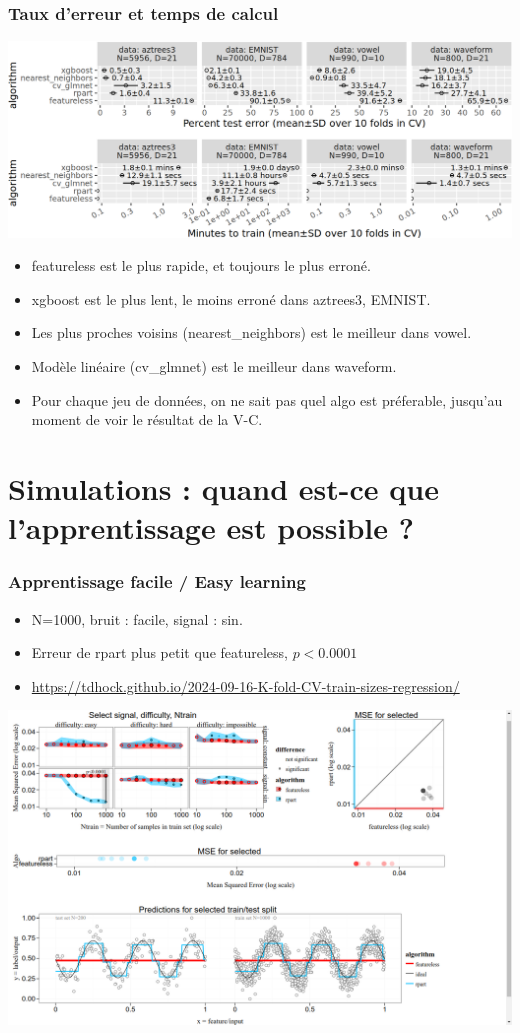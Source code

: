 \documentclass{beamer}
\begin{document}
\begin{frame}
  \frametitle{Taux d'erreur et temps de calcul}
  \includegraphics[width=\textwidth]{../cv-evaluation-examples/zz_error_minutes_4_data.png}
  \begin{itemize}
  \item featureless est le plus rapide, et toujours le plus erroné.  
  \item xgboost est le plus lent, le moins erroné dans aztrees3, EMNIST.
  \item Les plus proches voisins (nearest\_neighbors) est le meilleur dans vowel.
  \item Modèle linéaire (cv\_glmnet) est le meilleur dans waveform.
  \item Pour chaque jeu de données, on ne sait pas quel algo est
    préferable, jusqu'au moment de voir le résultat de la V-C.
  \end{itemize}
\end{frame}

\section{Simulations : quand est-ce que l'apprentissage est possible ? }

\begin{frame}
  \frametitle{Apprentissage facile / Easy learning}
  \begin{itemize}
  \item N=1000, bruit : facile, signal : sin.
  \item Erreur de rpart plus petit que featureless, $p<0.0001$
  \item \tiny \url{https://tdhock.github.io/2024-09-16-K-fold-CV-train-sizes-regression/}
  \end{itemize}
  \includegraphics[width=\textwidth]{easy-1000}
\end{frame}
\end{document}
